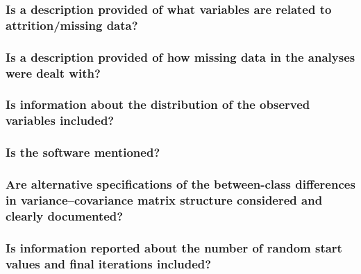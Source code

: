 \documentclass[
  english,
  man]{apa6}
\begin{document}
\hypertarget{is-a-description-provided-of-what-variables-are-related-to-attritionmissing-data}{%
\subsubsection{Is a description provided of what variables are related to attrition/missing data?}\label{is-a-description-provided-of-what-variables-are-related-to-attritionmissing-data}}

\hypertarget{is-a-description-provided-of-how-missing-data-in-the-analyses-were-dealt-with}{%
\subsubsection{Is a description provided of how missing data in the analyses were dealt with?}\label{is-a-description-provided-of-how-missing-data-in-the-analyses-were-dealt-with}}

\hypertarget{is-information-about-the-distribution-of-the-observed-variables-included}{%
\subsubsection{Is information about the distribution of the observed variables included?}\label{is-information-about-the-distribution-of-the-observed-variables-included}}

\hypertarget{is-the-software-mentioned}{%
\subsubsection{Is the software mentioned?}\label{is-the-software-mentioned}}

\hypertarget{are-alternative-specifications-of-the-between-class-differences-in-variancecovariance-matrix-structure-considered-and-clearly-documented}{%
\subsubsection{Are alternative specifications of the between-class differences in variance--covariance matrix structure considered and clearly documented?}\label{are-alternative-specifications-of-the-between-class-differences-in-variancecovariance-matrix-structure-considered-and-clearly-documented}}

\hypertarget{is-information-reported-about-the-number-of-random-start-values-and-final-iterations-included}{%
\subsubsection{Is information reported about the number of random start values and final iterations included?}\label{is-information-reported-about-the-number-of-random-start-values-and-final-iterations-included}}
\end{document}
